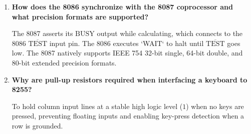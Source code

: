 \documentclass[12pt,a4paper]{article}
\newcommand{\Q}[1]{\textbf{#1}\par\noindent\ignorespaces}
\begin{document}
\begin{tcolorbox}[exambox, title={Frequently Asked / Viva Questions}]
\begin{enumerate}[leftmargin=*, label=\textbf{Q\arabic*.}, itemsep=2.5pt]
  \item \Q{How does the 8086 synchronize with the 8087 coprocessor and what precision formats are supported?}
  The 8087 asserts its $\mathrm{BUSY}$ output while calculating, which connects to the 8086 $\overline{\mathrm{TEST}}$ input pin. The 8086 executes `WAIT` to halt until $\overline{\mathrm{TEST}}$ goes low. The 8087 natively supports IEEE 754 32-bit single, 64-bit double, and 80-bit extended precision formats.
  \item \Q{Why are pull-up resistors required when interfacing a keyboard to 8255?}
  To hold column input lines at a stable high logic level ($1$) when no keys are pressed, preventing floating inputs and enabling key-press detection when a row is grounded.
\end{enumerate}
\end{tcolorbox}
\end{document}
